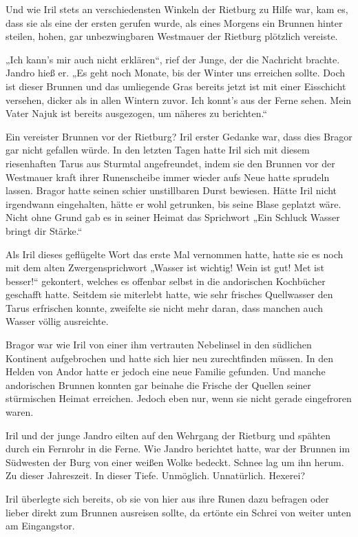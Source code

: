 Und wie Iril stets an verschiedensten Winkeln der Rietburg zu Hilfe war, kam es, dass sie als eine der ersten gerufen wurde, als eines Morgens ein Brunnen hinter steilen, hohen, gar unbezwingbaren Westmauer der Rietburg plötzlich vereiste.

„Ich kann’s mir auch nicht erklären“, rief der Junge, der die Nachricht brachte. Jandro hieß er. „Es geht noch Monate, bis der Winter uns erreichen sollte. Doch ist dieser Brunnen und das umliegende Gras bereits jetzt ist mit einer Eisschicht versehen, dicker als in allen Wintern zuvor. Ich konnt’s aus der Ferne sehen. Mein Vater Najuk ist bereits ausgezogen, um näheres zu berichten.“

Ein vereister Brunnen vor der Rietburg? Iril erster Gedanke war, dass dies Bragor gar nicht gefallen würde. In den letzten Tagen hatte Iril sich mit diesem riesenhaften Tarus aus Sturmtal angefreundet, indem sie den Brunnen vor der Westmauer kraft ihrer Runenscheibe immer wieder aufs Neue hatte sprudeln lassen. Bragor hatte seinen schier unstillbaren Durst bewiesen. Hätte Iril nicht irgendwann eingehalten, hätte er wohl getrunken, bis seine Blase geplatzt wäre. Nicht ohne Grund gab es in seiner Heimat das Sprichwort „Ein Schluck Wasser bringt dir Stärke.“

Als Iril dieses geflügelte Wort das erste Mal vernommen hatte, hatte sie es noch mit dem alten Zwergensprichwort „Wasser ist wichtig! Wein ist gut! Met ist besser!“ gekontert, welches es offenbar selbst in die andorischen Kochbücher geschafft hatte. Seitdem sie miterlebt hatte, wie sehr frisches Quellwasser den Tarus erfrischen konnte, zweifelte sie nicht mehr daran, dass manchen auch Wasser völlig ausreichte.

Bragor war wie Iril von einer ihm vertrauten Nebelinsel in den südlichen Kontinent aufgebrochen und hatte sich hier neu zurechtfinden müssen. In den Helden von Andor hatte er jedoch eine neue Familie gefunden. Und manche andorischen Brunnen konnten gar beinahe die Frische der Quellen seiner stürmischen Heimat erreichen. Jedoch eben nur, wenn sie nicht gerade eingefroren waren.

Iril und der junge Jandro eilten auf den Wehrgang der Rietburg und spähten durch ein Fernrohr in die Ferne. Wie Jandro berichtet hatte, war der Brunnen im Südwesten der Burg von einer weißen Wolke bedeckt. Schnee lag um ihn herum. Zu dieser Jahreszeit. In dieser Tiefe. Unmöglich. Unnatürlich. Hexerei?

Iril überlegte sich bereits, ob sie von hier aus ihre Runen dazu befragen oder lieber direkt zum Brunnen ausreisen sollte, da ertönte ein Schrei von weiter unten am Eingangstor.

